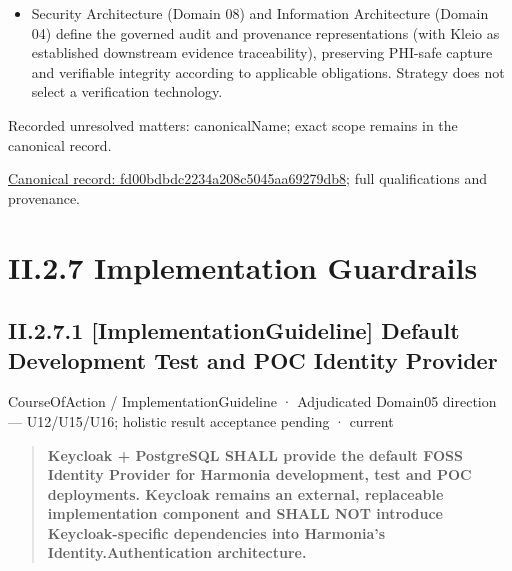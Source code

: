 \begin{itemize}


\item Security Architecture (Domain 08) and Information Architecture (Domain 04) define the governed audit and provenance representations (with Kleio as established downstream evidence traceability), preserving PHI-safe capture and verifiable integrity according to applicable obligations. Strategy does not select a verification technology.

\end{itemize}

{\small Recorded unresolved matters: canonicalName; exact scope remains in the canonical record.}\par
{\footnotesize \href{../../../../continuum/strategy/course-of-action/fd00bdbdc2234a208c5045aa69279db8.md}{Canonical record: fd00bdbdc2234a208c5045aa69279db8}; full qualifications and provenance.}\par
\section*{II.2.7 Implementation Guardrails}
\label{navigation:II.2.7}

\subsection*{II.2.7.1 [ImplementationGuideline] Default Development Test and POC Identity Provider}
\label{navigation:II.2.7.1}

\label{element:f8874dd3bc5c4b68b1ece4eb2859d1d9}
{\small CourseOfAction / ImplementationGuideline · Adjudicated Domain05 direction — U12/U15/U16; holistic result acceptance pending · current}\par

\begin{quote}


\textbf{Keycloak + PostgreSQL SHALL provide the default FOSS Identity Provider for Harmonia development, test and POC deployments. Keycloak remains an external, replaceable implementation component and SHALL NOT introduce Keycloak-specific dependencies into Harmonia's Identity.Authentication architecture.}



\end{quote}


